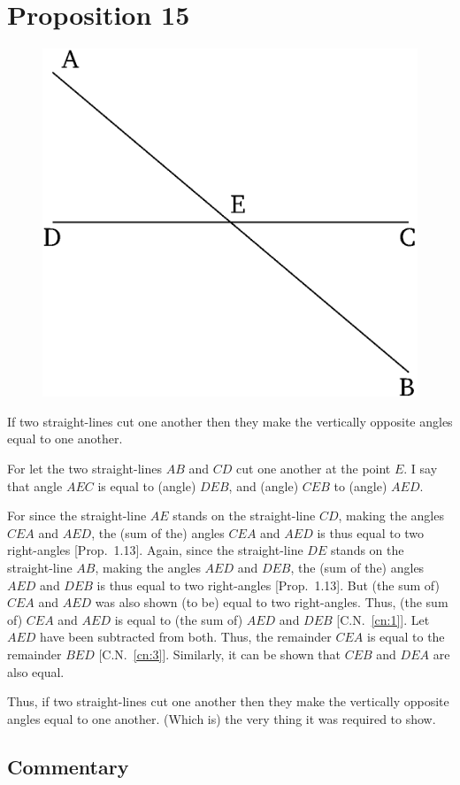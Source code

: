\chapter*{Proposition 15}
\label{prop:15}

\begin{figure}[ht]
    \begin{center}
    \includegraphics[width=0.5\linewidth]{figures/fig15e.eps}
    \label{fig:prop_15}
    \end{center}
\end{figure}

If two straight-lines cut one another then they make the vertically opposite angles
equal to one another.

For let the two straight-lines $AB$ and $CD$ cut one another at the point $E$. I say
that  angle $AEC$ is equal to (angle) $DEB$, and (angle) $CEB$ to (angle) $AED$.

For since the straight-line $AE$ stands on the straight-line $CD$, making the
angles $CEA$ and $AED$, the (sum of the) angles $CEA$ and $AED$ is thus equal to two
right-angles [Prop.~1.13]. Again, since the straight-line $DE$ stands on the
straight-line $AB$, making the angles $AED$ and $DEB$, the (sum of the) angles $AED$ and
$DEB$ is thus equal to two right-angles [Prop.~1.13]. But (the sum of) $CEA$ and $AED$ was also shown
(to be) equal to two right-angles. Thus, (the sum of) $CEA$ and $AED$ is equal to (the sum of) $AED$ and $DEB$ [C.N.~\ref{cn:1}]. Let $AED$ have been subtracted from both. Thus, the remainder
$CEA$ is equal to the remainder $BED$ [C.N.~\ref{cn:3}]. Similarly, it can be shown that
$CEB$ and $DEA$ are also equal.

Thus, if two straight-lines cut one another then they make the vertically opposite angles
equal to one another. (Which is) the very thing it was required to show.


\section*{Commentary}

